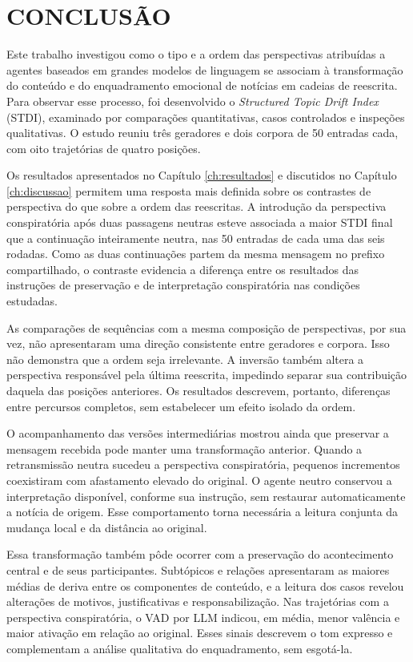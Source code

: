 \chapter{CONCLUSÃO}
\label{ch:conclusao}

Este trabalho investigou como o tipo e a ordem das perspectivas atribuídas a agentes baseados em grandes modelos de linguagem se associam à transformação do conteúdo e do enquadramento emocional de notícias em cadeias de reescrita. Para observar esse processo, foi desenvolvido o \textit{Structured Topic Drift Index} (STDI), examinado por comparações quantitativas, casos controlados e inspeções qualitativas. O estudo reuniu três geradores e dois corpora de 50 entradas cada, com oito trajetórias de quatro posições.

Os resultados apresentados no Capítulo \ref{ch:resultados} e discutidos no Capítulo \ref{ch:discussao} permitem uma resposta mais definida sobre os contrastes de perspectiva do que sobre a ordem das reescritas. A introdução da perspectiva conspiratória após duas passagens neutras esteve associada a maior STDI final que a continuação inteiramente neutra, nas 50 entradas de cada uma das seis rodadas. Como as duas continuações partem da mesma mensagem no prefixo compartilhado, o contraste evidencia a diferença entre os resultados das instruções de preservação e de interpretação conspiratória nas condições estudadas.

As comparações de sequências com a mesma composição de perspectivas, por sua vez, não apresentaram uma direção consistente entre geradores e corpora. Isso não demonstra que a ordem seja irrelevante. A inversão também altera a perspectiva responsável pela última reescrita, impedindo separar sua contribuição daquela das posições anteriores. Os resultados descrevem, portanto, diferenças entre percursos completos, sem estabelecer um efeito isolado da ordem.

O acompanhamento das versões intermediárias mostrou ainda que preservar a mensagem recebida pode manter uma transformação anterior. Quando a retransmissão neutra sucedeu a perspectiva conspiratória, pequenos incrementos coexistiram com afastamento elevado do original. O agente neutro conservou a interpretação disponível, conforme sua instrução, sem restaurar automaticamente a notícia de origem. Esse comportamento torna necessária a leitura conjunta da mudança local e da distância ao original.

Essa transformação também pôde ocorrer com a preservação do acontecimento central e de seus participantes. Subtópicos e relações apresentaram as maiores médias de deriva entre os componentes de conteúdo, e a leitura dos casos revelou alterações de motivos, justificativas e responsabilização. Nas trajetórias com a perspectiva conspiratória, o VAD por LLM indicou, em média, menor valência e maior ativação em relação ao original. Esses sinais descrevem o tom expresso e complementam a análise qualitativa do enquadramento, sem esgotá-la.

